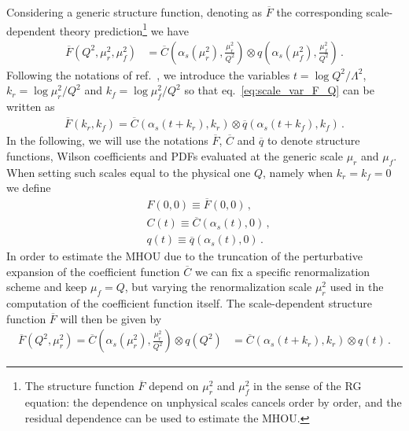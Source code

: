 Considering a generic structure function, 
denoting as $\overline{F}$ the corresponding scale-dependent theory prediction\footnote{The structure 
function $\overline{F}$ depend on $\mu_r^2$ and $\mu_f^2$ in the sense of the RG
equation: the dependence on unphysical scales cancels order by order, and the residual dependence can
be used to estimate the MHOU.}
we have 
\begin{align}
\label{eq:scale_var_F_Q}
    \overline{F}\left(Q^2,\mu_r^2, \mu_f^2\right) &= 
    \overline{C}\left(\alpha_s\left(\mu_r^2\right),\frac{\mu_r^2}{Q^2}\right)\otimes 
    q\left(\alpha_s\left(\mu_f^2\right),\frac{\mu_f^2}{Q^2}\right)\,. 
\end{align}
Following the notations of ref.~\cite{AbdulKhalek:2019ihb}, we introduce the variables
$t = \log Q^2/\Lambda^2$, $k_r = \log \mu_r^2/Q^2$ and $k_f = \log \mu_f^2/Q^2$ so that eq.~\eqref{eq:scale_var_F_Q}
can be written as 
\begin{align}
    \label{eq:scale_var_F}
    \overline{F}\left(k_r, k_f\right)=
    \overline{C}\left(\alpha_s\left(t+k_r\right),k_r\right)\otimes \overline{q}\left(\alpha_s\left(t+k_f\right),k_f\right)\,.
    \end{align}
In the following, we will use the notations $\overline{F}$, $\overline{C}$ and $\overline{q}$ to denote 
structure functions, Wilson coefficients and PDFs evaluated at the generic scale $\mu_r$ and $\mu_f$.
When setting such scales equal to the physical one $Q$, namely when $k_r = k_f=0$ we define
\begin{align}
    \label{eq:central_scale}
    &F\left(0,0\right) \equiv \overline{F}\left(0, 0\right)\,, \nonumber\\
    &C\left(t\right)   \equiv \overline{C}\left(\alpha_s\left(t\right),0\right)\,,\\
    &q\left(t\right)   \equiv \overline{q}\left(\alpha_s\left(t\right),0\right)\,. \nonumber
\end{align}
In order to estimate the MHOU due to the truncation of the perturbative expansion of the coefficient function 
$\overline{C}$ we can fix a specific renormalization scheme and keep $\mu_f = Q$, but varying
the renormalization scale $\mu_r^2$ used in the computation of the coefficient function itself.
The scale-dependent structure function $\overline{F}$ will then be given by
\begin{align}
    \overline{F}\left(Q^2,\mu_r^2\right) = 
    \overline{C}\left(\alpha_s\left(\mu_r^2\right),\frac{\mu_r^2}{Q^2}\right)\otimes q\left(Q^2\right) 
    &=\overline{C}\left(\alpha_s\left(t+k_r\right),k_r\right)\otimes q\left(t\right)\,.
\end{align}
